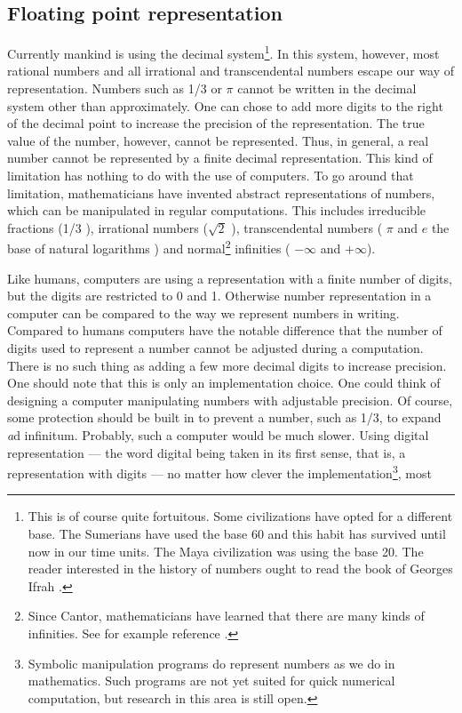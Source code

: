 \subsection{Floating point representation}
Currently mankind is using the decimal system\footnote{This is of
course quite fortuitous. Some civilizations have opted for a
different base. The Sumerians have used the base 60 and this habit
has survived until now in our time units. The Maya civilization
was using the base 20. The reader interested in the history of
numbers ought to read the book of Georges Ifrah \cite{Ifrah}.}. In
this system, however, most rational numbers and all irrational and
transcendental numbers escape our way of representation. Numbers
such as 1/3 or $\pi$ cannot be written in the decimal system other
than approximately. One can chose to add more digits to the right
of the decimal point to increase the precision of the
representation. The true value of the number, however, cannot be
represented. Thus, in general, a real number cannot be represented
by a finite decimal representation. This kind of limitation has
nothing to do with the use of computers. To go around that
limitation, mathematicians have invented abstract representations
of numbers, which can be manipulated in regular computations. This
includes irreducible fractions (1/3 \eg), irrational numbers
($\sqrt{2}$ \eg), transcendental numbers ( $\pi$ and $e$ the base
of natural logarithms \eg) and normal\footnote{Since Cantor,
mathematicians have learned that there are many kinds of
infinities. See for example reference \cite{Gullberg}.} infinities
( $-\infty$ and $+\infty$).
\par
Like humans, computers are using a representation with a finite
number of digits, but the digits are restricted to 0 and 1.
Otherwise number representation in a computer can be compared to
the way we represent numbers in writing. Compared to humans
computers have the notable difference that the number of digits
used to represent a number cannot be adjusted during a
computation. There is no such thing as adding a few more decimal
digits to increase precision. One should note that this is only an
implementation choice. One could think of designing a computer
manipulating numbers with adjustable precision. Of course, some
protection should be built in to prevent a number, such as 1/3, to
expand {\textit ad infinitum}. Probably, such a computer would be much
slower. Using digital representation --- the word digital being
taken in its first sense, that is, a representation with digits
--- no matter how clever the implementation\footnote{Symbolic
manipulation programs do represent numbers as we do in
mathematics. Such programs are not yet suited for quick numerical
computation, but research in this area is still open.}, most
